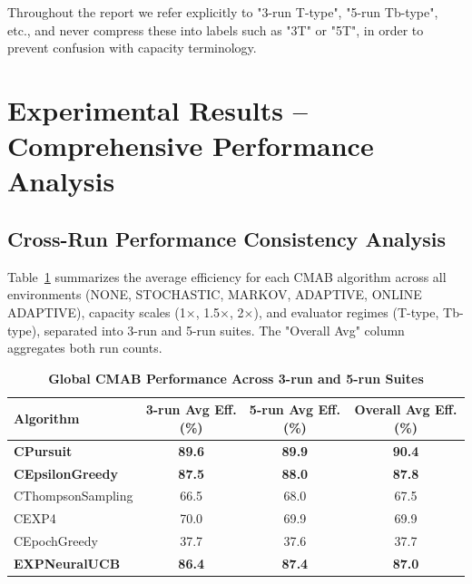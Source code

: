 \documentclass[12pt,a4paper]{article}
\newcommand{\performance}[1]{\textcolor{performancecolor}{\textbf{#1}}}
\newcommand{\legacy}[1]{\textcolor{legacycolor}{\textbf{#1}}}
\begin{document}
Throughout the report we refer explicitly to "3-run T-type", "5-run Tb-type", etc., and never compress these into labels such as "3T" or "5T", in order to prevent confusion with capacity terminology.

\newpage
\section{Experimental Results – Comprehensive Performance Analysis}

\begin{tcolorbox}[colback=performancecolor!10,colframe=performancecolor,title=\textbf{Primary Performance Results (Aggregated Across Capacities, Environments, and Regimes)}]

\subsection{Cross-Run Performance Consistency Analysis}

Table~\ref{tab:global-performance} summarizes the average efficiency for each CMAB algorithm across all environments (NONE, STOCHASTIC, MARKOV, ADAPTIVE, ONLINE ADAPTIVE), capacity scales (1$\times$, 1.5$\times$, 2$\times$), and evaluator regimes (T-type, Tb-type), separated into 3-run and 5-run suites. The "Overall Avg" column aggregates both run counts.

\begin{table}[H]
\centering
\caption{\performance{Global CMAB Performance Across 3-run and 5-run Suites}}
\label{tab:global-performance}
\begin{tabular}{|l|c|c|c|}
\hline
\textbf{Algorithm} & \textbf{3-run Avg Eff. (\%)} & \textbf{5-run Avg Eff. (\%)} & \textbf{Overall Avg Eff. (\%)} \\
\hline
\hline
\performance{CPursuit}        & \performance{89.6} & \performance{89.9} & \performance{\textbf{90.4}} \\
\performance{CEpsilonGreedy} & \performance{87.5} & \performance{88.0} & \performance{\textbf{87.8}} \\
CThompsonSampling            & 66.5              & 68.0              & 67.5 \\
CEXP4                        & 70.0              & 69.9              & 69.9 \\
CEpochGreedy                 & 37.7              & 37.6              & 37.7 \\
\legacy{EXPNeuralUCB}        & \legacy{86.4}     & \legacy{87.4}     & \legacy{87.0} \\
\hline
\end{tabular}
\end{table}


\end{tcolorbox}
\end{document}
